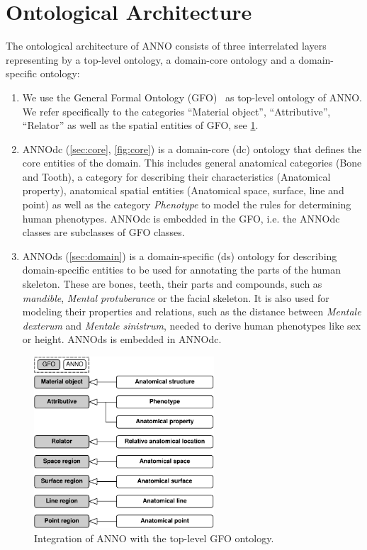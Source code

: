 \documentclass[sw]{iosart2x}
\begin{document}

\section{Ontological Architecture}\label{sec:architecture}

The ontological architecture of ANNO consists of three interrelated layers representing by a top-level ontology, a domain-core ontology and a domain-specific ontology:

\begin{enumerate}
\item We use the General Formal Ontology (GFO)~\citep{gfo} as top-level ontology of ANNO.
We refer specifically to the categories \enquote{Material object}, \enquote{Attributive}, \enquote{Relator} as well as the spatial entities of GFO, see \cref{fig:gfo}. %

\item ANNOdc (\cref{sec:core}, \cref{fig:core}) is a domain-core (dc) ontology that defines the core entities of the domain.
This includes general anatomical categories (Bone and Tooth), a category for describing their characteristics (Anatomical property), anatomical spatial entities (Anatomical space, surface, line and point) as well as the category \emph{Phenotype} to model the rules for determining human phenotypes.
ANNOdc is embedded in the GFO, i.e. the ANNOdc classes are subclasses of GFO classes.

\item ANNOds (\cref{sec:domain}) is a domain-specific (ds) ontology for describing domain-specific entities to be used for annotating the parts of the human skeleton.
These are bones, teeth, their parts and compounds, such as \emph{mandible}, \emph{Mental protuberance} or the facial skeleton.
It is also used for modeling their properties and relations, such as the distance between \emph{Mentale dexterum} and \emph{Mentale sinistrum}, needed to derive human phenotypes like sex or height.
ANNOds is embedded in ANNOdc.
\end{enumerate}

\begin{figure}[h]
\includegraphics[width=0.6\textwidth]{img/gfo.pdf}
\caption{Integration of ANNO with the top-level GFO ontology.}\label{fig:gfo}
\end{figure}
\end{document}
